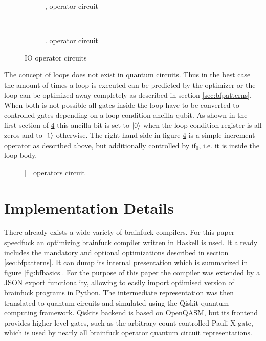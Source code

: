 \documentclass[11pt, a4paper]{article}
\DeclarePairedDelimiter\ket{\lvert}{\rangle}
\begin{document}
\begin{figure}[H]
	\begin{subfigure}[b]{.45\textwidth}
		\centering
		
		\caption{, operator circuit}
		\label{fig:op:input}
	\end{subfigure}
	~
	\begin{subfigure}[b]{.54\textwidth}
		\centering
		
		\caption{. operator circuit}
		\label{fig:op:output}
	\end{subfigure}
	\caption{IO operator circuits}
	\label{fig:op:io}
\end{figure}

The concept of loops does not exist in quantum circuits. Thus in the best case the amount of times a loop is executed can be predicted by the optimizer or the loop can be optimized away completely as described in section \ref{sec:bfpatterns}. When both is not possible all gates inside the loop have to be converted to controlled gates depending on a loop condition ancilla qubit. As shown in the first section of \ref{fig:op:loop} this ancilla bit is set to $\ket{0}$ when the loop condition register is all zeros and to $\ket{1}$ otherwise. The right hand side in figure \ref{fig:op:loop} is a simple increment operator as described above, but additionally controlled by $\text{if}_0$, i.e. it is inside the loop body.
\begin{figure}[H]
	\centering
	
	\caption{[ ] operators circuit}
	\label{fig:op:loop}
\end{figure}



\section{Implementation Details} \label{sec:implementation}
There already exists a wide variety of brainfuck compilers\cite{speedfuck, bfc0, bfc1, bfc2, bfc3}. For this paper speedfuck\cite{speedfuck} an optimizing brainfuck compiler written in Haskell is used. It already includes the mandatory and optional optimizations described in section \ref{sec:bfpatterns}. It can dump its internal presentation which is summarized in figure \ref{fig:bfbasics}. For the purpose of this paper the compiler was extended by a JSON export functionality, allowing to easily import optimised version of brainfuck programs in Python. The intermediate representation was then translated to quantum circuits and simulated using the Qiskit quantum computing framework\cite{qiskit}. Qiskits backend is based on OpenQASM\cite{openqasm}, but its frontend provides higher level gates, such as the arbitrary count controlled Pauli X gate, which is used by nearly all brainfuck operator quantum circuit representations.
\end{document}

